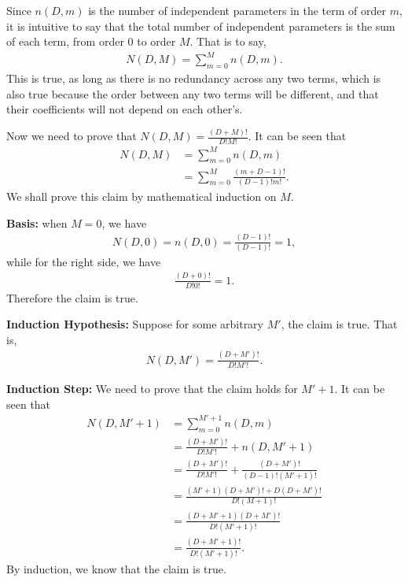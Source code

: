 \begin{answer}{}
	Since $n(D, m)$ is the number of independent parameters in the term of order $m$, it is intuitive to say that the total number of independent parameters is the sum of each term, from order $0$ to order $M$. That is to say,
	\begin{align}
		N(D, M) = \sum_{m = 0}^M n(D, m).
	\end{align}
	This is true, as long as there is no redundancy across any two terms, which is also true because the order between any two terms will be different, and that their coefficients will not depend on each other's.
	
	Now we need to prove that $N(D, M) = \frac{(D + M)!}{D!M!}$. It can be seen that
	\begin{align}
		N(D, M) &= \sum_{m = 0}^{M} n(D, m)\\
		&= \sum_{m = 0}^{M} \frac{(m + D - 1)!}{(D-1)!m!}.
	\end{align}
	We shall prove this claim by mathematical induction on $M$.
	
	\noindent\textbf{Basis:} when $M = 0$, we have
	\begin{align}
		N(D, 0) = n(D, 0) = \frac{(D-1)!}{(D-1)!} = 1,
	\end{align}
	while for the right side, we have
	\begin{align}
		\frac{(D + 0)!}{D!0!} = 1.
	\end{align}
	Therefore the claim is true.
	
	\noindent\textbf{Induction Hypothesis:} Suppose for some arbitrary $M'$, the claim is true. That is,
	\begin{align}
		N(D, M') = \frac{(D + M')!}{D!M'!}.
	\end{align}
	
	\noindent\textbf{Induction Step:} We need to prove that the claim holds for $M' + 1$. It can be seen that
	\begin{align}
		N(D, M' + 1) &= \sum_{m = 0}^{M' + 1} n(D, m)\\
		&= \frac{(D + M')!}{D!M'!} + n(D, M' + 1)\\
		&= \frac{(D + M')!}{D!M'!}  + \frac{(D + M')!}{(D-1)!(M'+1)!}\\
		&= \frac{(M' + 1)(D + M')! + D(D + M')!}{D!(M+1)!}\\
		&= \frac{(D + M' + 1)(D + M')!}{D!(M' + 1)!}\\
		&= \frac{(D + M' + 1)!}{D!(M' + 1)!}.
	\end{align}
	By induction, we know that the claim is true.
	

\end{answer}
